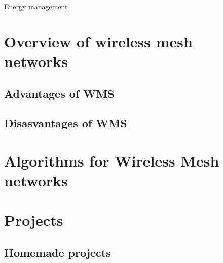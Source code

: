 		Energy management
		
	
	
	\section{Overview of wireless mesh networks}
	
	
	
	
	
		\subsection{Advantages of WMS}
		
		\subsection{Disasvantages of WMS}
	
	\section{Algorithms for Wireless Mesh networks}
	
						
	
	\section{Projects}
		
		\subsection{Homemade projects}
		
